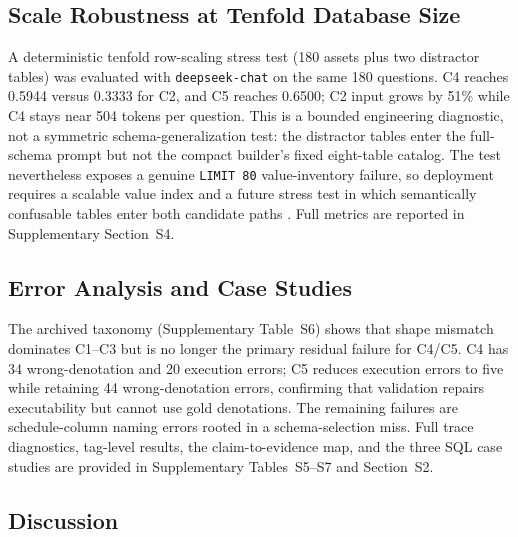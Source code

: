 \documentclass{article}
\begin{document}
\subsection{Scale Robustness at Tenfold Database Size}\label{scale-robustness}

A deterministic tenfold row-scaling stress test (180 assets plus two distractor tables) was evaluated with \texttt{deepseek-chat} on the same 180 questions. C4 reaches 0.5944 versus 0.3333 for C2, and C5 reaches 0.6500; C2 input grows by 51\% while C4 stays near 504 tokens per question. This is a bounded engineering diagnostic, not a symmetric schema-generalization test: the distractor tables enter the full-schema prompt but not the compact builder's fixed eight-table catalog. The test nevertheless exposes a genuine \texttt{LIMIT 80} value-inventory failure, so deployment requires a scalable value index and a future stress test in which semantically confusable tables enter both candidate paths \cite{talaei2024chess}. Full metrics are reported in Supplementary Section~S4.

\subsection{Error Analysis and Case Studies}\label{sect:r5}

The archived taxonomy (Supplementary Table~S6) shows that shape mismatch dominates C1--C3 but is no longer the primary residual failure for C4/C5. C4 has 34 wrong-denotation and 20 execution errors; C5 reduces execution errors to five while retaining 44 wrong-denotation errors, confirming that validation repairs executability but cannot use gold denotations. The remaining failures are schedule-column naming errors rooted in a schema-selection miss. Full trace diagnostics, tag-level results, the claim-to-evidence map, and the three SQL case studies are provided in Supplementary Tables~S5--S7 and Section~S2.

\subsection{Discussion}\label{sect:r6}
\end{document}
